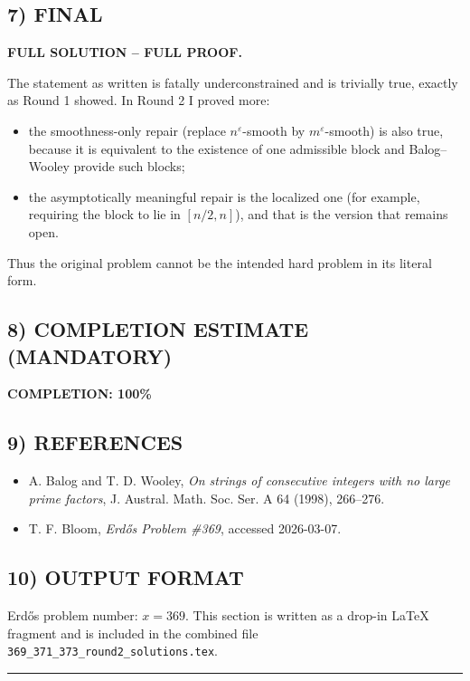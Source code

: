 \subsection*{7) FINAL}
\textbf{FULL SOLUTION -- FULL PROOF.}

The statement as written is fatally underconstrained and is trivially true, exactly as Round 1 showed. In Round 2 I proved more:
\begin{itemize}
\item the smoothness-only repair (replace $n^{\varepsilon}$-smooth by $m^{\varepsilon}$-smooth) is also true, because it is equivalent to the existence of one admissible block and Balog--Wooley provide such blocks;
\item the asymptotically meaningful repair is the localized one (for example, requiring the block to lie in $[n/2,n]$), and that is the version that remains open.
\end{itemize}
Thus the original problem cannot be the intended hard problem in its literal form.

\subsection*{8) COMPLETION ESTIMATE (MANDATORY)}
\textbf{COMPLETION: 100\%}

\subsection*{9) REFERENCES}
\begin{itemize}
\item A. Balog and T. D. Wooley, \emph{On strings of consecutive integers with no large prime factors}, J. Austral. Math. Soc. Ser. A 64 (1998), 266--276.
\item T. F. Bloom, \emph{Erd\H{o}s Problem \#369}, accessed 2026-03-07.
\end{itemize}

\subsection*{10) OUTPUT FORMAT}
Erd\H{o}s problem number: $x=369$. This section is written as a drop-in \LaTeX{} fragment and is included in the combined file \texttt{369\_371\_373\_round2\_solutions.tex}.

\bigskip
\hrule
\bigskip

